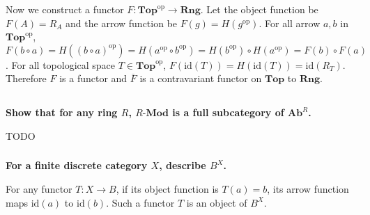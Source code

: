 \documentclass{article}
\begin{document}
Now we construct a functor $F : \mathbf{Top}^{\mathrm{op}} \rightarrow \mathbf{Rng}$. Let the object function be $F(A) = R_A$ and the arrow function be $F(g) = H(g^{\mathrm{op}})$. For all arrow $a, b$ in $\mathbf{Top}^{\mathrm{op}}$, $F(b \circ a) = H((b \circ a)^{\mathrm{op}}) = H(a^{\mathrm{op}} \circ b^{\mathrm{op}}) = H(b^{\mathrm{op}}) \circ H(a^{\mathrm{op}}) = F(b) \circ F(a)$. For all topological space $T \in \mathbf{Top}^{\mathrm{op}}$, $F(\mathrm{id}(T)) = H(\mathrm{id}(T)) = \mathrm{id}(R_T)$. Therefore $F$ is a functor and $\overline{F}$ is a contravariant functor on $\mathbf{Top}$ to $\mathbf{Rng}$.

\subsection{}

\subsubsection{}

\textbf{Show that for any ring $R$, $R\textbf{-}\mathbf{Mod}$ is a full subcategory of $\mathbf{Ab}^R$.}

TODO






\subsubsection{}

\textbf{For a finite discrete category $X$, describe $B^X$.}

For any functor $T : X \rightarrow B$, if its object function is $T(a) = b$, its arrow function maps $\mathrm{id}(a)$ to $\mathrm{id}(b)$. Such a functor $T$ is an object of $B^X$.
\end{document}
